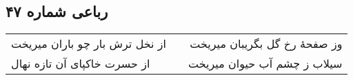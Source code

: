 \begin{center}
\section*{رباعی شماره ۴۷}
\label{sec:sh047}
\begin{longtable}{l p{0.5cm} r}
از نخل ترش بار چو باران میریخت
&&
وز صفحهٔ رخ گل بگریبان میریخت
\\
از حسرت خاکپای آن تازه نهال
&&
سیلاب ز چشم آب حیوان میریخت
\\
\end{longtable}
\end{center}
